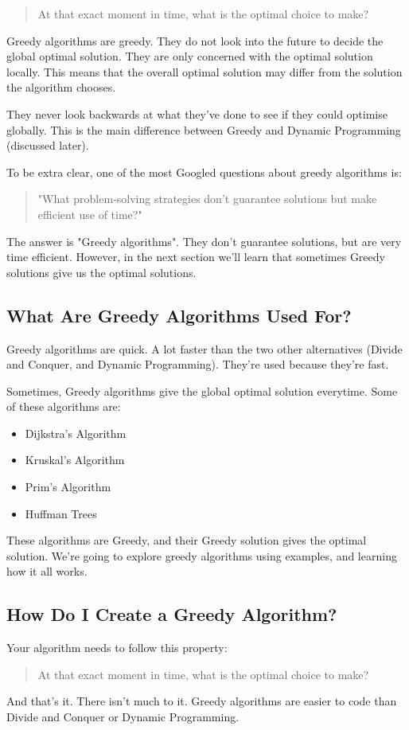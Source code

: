 \documentclass{article}
\begin{document}
\begin{quote}
    At that exact moment in time, what is the optimal choice to make?
\end{quote}

Greedy algorithms are greedy. They do not look into the future to decide the global optimal solution. They are only concerned with the optimal solution locally. This means that the overall optimal solution may differ from the solution the algorithm chooses.

They never look backwards at what they've done to see if they could optimise globally. This is the main difference between Greedy and Dynamic Programming (discussed later).

To be extra clear, one of the most Googled questions about greedy algorithms is:

\begin{quote}
    "What problem-solving strategies don't guarantee solutions but make efficient use of time?"
\end{quote}

The answer is "Greedy algorithms". They don't guarantee solutions, but are very time efficient. However, in the next section we'll learn that sometimes Greedy solutions give us the optimal solutions.
\newpage
\subsection{What Are Greedy Algorithms Used For?}
Greedy algorithms are quick. A lot faster than the two other alternatives (Divide and Conquer, and Dynamic Programming). They're used because they're fast.

Sometimes, Greedy algorithms give the global optimal solution everytime. Some of these algorithms are:
\begin{itemize}
    \item Dijkstra's Algorithm
    \item Kruskal's Algorithm
    \item Prim's Algorithm
    \item Huffman Trees
\end{itemize}

These algorithms are Greedy, and their Greedy solution gives the optimal solution.
We're going to explore greedy algorithms using examples, and learning how it all works.
\newpage
\subsection{How Do I Create a Greedy Algorithm?}
Your algorithm needs to follow this property:
\begin{quote}
    At that exact moment in time, what is the optimal choice to make?
\end{quote}
And that's it. There isn't much to it. Greedy algorithms are easier to code than Divide and Conquer or Dynamic Programming.
\newpage
\end{document}
